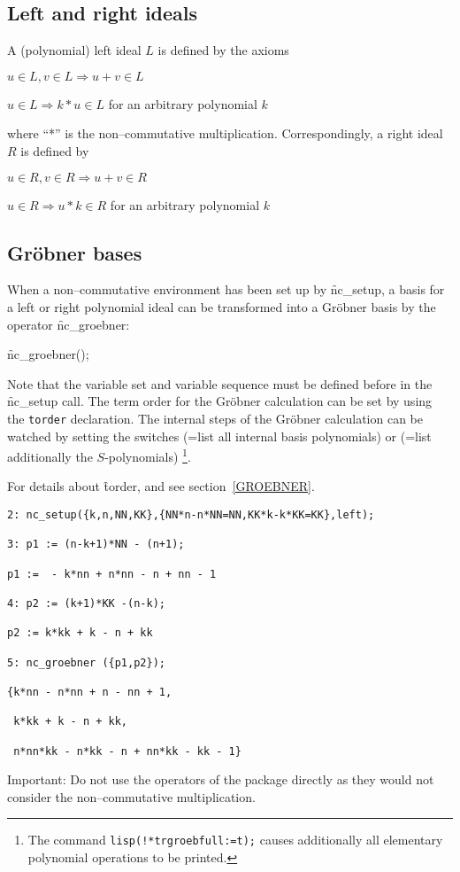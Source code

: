 \subsection{Left and right ideals}

A (polynomial) left ideal $L$ is defined by the axioms

$u \in L, v \in L \Longrightarrow u+v \in L$

$u \in L \Longrightarrow k*u \in L$ for an arbitrary polynomial $k$

where ``*'' is the non--commutative multiplication. Correspondingly,
a right ideal $R$ is defined by

$u \in R, v \in R \Longrightarrow u+v \in R$

$u \in R \Longrightarrow u*k \in R$ for an arbitrary polynomial $k$

\subsection{Gr\"obner bases}

\hypertarget{operator:NC_GROEBNER}{}
When a non--commutative environment has been set up
by \f{nc\_setup}, a basis for a left or right polynomial ideal
can be transformed into a Gr\"obner basis by the operator
\f{nc\_groebner}:
\begin{syntax}
   \f{nc\_groebner}();
\end{syntax}
Note that the variable set and variable sequence must be
defined before in the \f{nc\_setup} call. The term order
for the Gr\"obner calculation can be set by using the
\texttt{torder} declaration. The internal steps of the
Gr\"obner calculation can be watched by setting the
switches  (=list all internal basis polynomials)
or  (=list additionally the $S$-polynomials)
\footnote{The command \texttt{lisp(!*trgroebfull:=t);} causes additionally
all elementary polynomial operations to be printed.}.


For details about \f{torder},  and 
see section~\ref{GROEBNER}.
\begin{verbatim}
2: nc_setup({k,n,NN,KK},{NN*n-n*NN=NN,KK*k-k*KK=KK},left);

3: p1 := (n-k+1)*NN - (n+1);

p1 :=  - k*nn + n*nn - n + nn - 1

4: p2 := (k+1)*KK -(n-k);

p2 := k*kk + k - n + kk

5: nc_groebner ({p1,p2});

{k*nn - n*nn + n - nn + 1,

 k*kk + k - n + kk,

 n*nn*kk - n*kk - n + nn*kk - kk - 1}

\end{verbatim}
Important: Do not use the operators of the 
package directly as they would not consider the non--commutative
multiplication.

